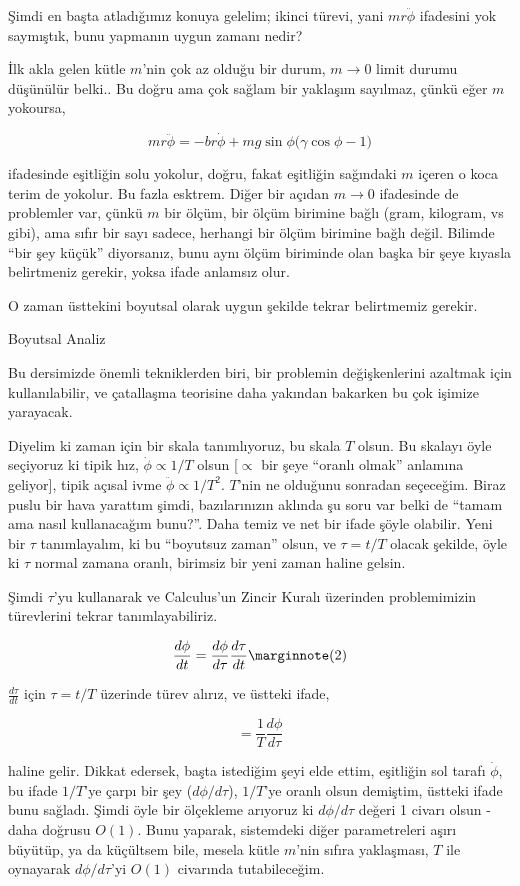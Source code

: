 \documentclass[12pt,fleqn]{article}\usepackage{../../common}
\begin{document}
Şimdi en başta atladığımız konuya gelelim; ikinci türevi, yani $mr\ddot{\phi}$
ifadesini yok saymıştık, bunu yapmanın uygun zamanı nedir?

İlk akla gelen kütle $m$'nin çok az olduğu bir durum, $m \to 0$ limit durumu
düşünülür belki.. Bu doğru ama çok sağlam bir yaklaşım sayılmaz, çünkü eğer $m$
yokoursa,

$$ mr\ddot{\phi} = -br\dot{\phi} + mg\sin\phi \bigg(\gamma \cos\phi - 1 \bigg)
$$

ifadesinde eşitliğin solu yokolur, doğru, fakat eşitliğin sağındaki $m$ içeren o
koca terim de yokolur. Bu fazla esktrem. Diğer bir açıdan $m \to 0$ ifadesinde
de problemler var, çünkü $m$ bir ölçüm, bir ölçüm birimine bağlı (gram,
kilogram, vs gibi), ama sıfır bir sayı sadece, herhangi bir ölçüm birimine bağlı
değil. Bilimde ``bir şey küçük'' diyorsanız, bunu aynı ölçüm biriminde olan
başka bir şeye kıyasla belirtmeniz gerekir, yoksa ifade anlamsız olur.

O zaman üsttekini boyutsal olarak uygun şekilde tekrar belirtmemiz gerekir.

Boyutsal Analiz

Bu dersimizde önemli tekniklerden biri, bir problemin değişkenlerini azaltmak
için kullanılabilir, ve çatallaşma teorisine daha yakından bakarken bu çok
işimize yarayacak.

Diyelim ki zaman için bir skala tanımlıyoruz, bu skala $T$ olsun. Bu skalayı
öyle seçiyoruz ki tipik hız, $\dot{\phi} \propto 1/T$ olsun [$\propto$ bir şeye
  ``oranlı olmak'' anlamına geliyor], tipik açısal ivme $\ddot{\phi} \propto
1/T^2$. $T$'nin ne olduğunu sonradan seçeceğim. Biraz puslu bir hava yarattım
şimdi, bazılarınızın aklında şu soru var belki de ``tamam ama nasıl kullanacağım
bunu?''. Daha temiz ve net bir ifade şöyle olabilir. Yeni bir $\tau$
tanımlayalım, ki bu ``boyutsuz zaman'' olsun, ve $\tau = t / T$ olacak şekilde,
öyle ki $\tau$ normal zamana oranlı, birimsiz bir yeni zaman haline gelsin.

Şimdi $\tau$'yu kullanarak ve Calculus'un Zincir Kuralı üzerinden problemimizin
türevlerini tekrar tanımlayabiliriz.

$$ 
\frac{d\phi}{dt} = \frac{d\phi}{d\tau} \frac{d\tau}{dt} 
\mlabel{2} 
$$

$\frac{d\tau}{dt}$ için $\tau = t / T$ üzerinde türev alırız, ve üstteki ifade,

$$ = \frac{1}{T} \frac{d\phi}{d\tau} $$

haline gelir. Dikkat edersek, başta istediğim şeyi elde ettim, eşitliğin sol
tarafı $\dot{\phi}$, bu ifade $1/T$'ye çarpı bir şey ($d\phi/d\tau$), $1/T$'ye
oranlı olsun demiştim, üstteki ifade bunu sağladı. Şimdi öyle bir ölçekleme
arıyoruz ki $d\phi/d\tau$ değeri 1 civarı olsun - daha doğrusu $O(1)$. Bunu
yaparak, sistemdeki diğer parametreleri aşırı büyütüp, ya da küçültsem bile,
mesela kütle $m$'nin sıfıra yaklaşması, $T$ ile oynayarak $d\phi/d\tau$'yi
$O(1)$ civarında tutabileceğim.
\end{document}
